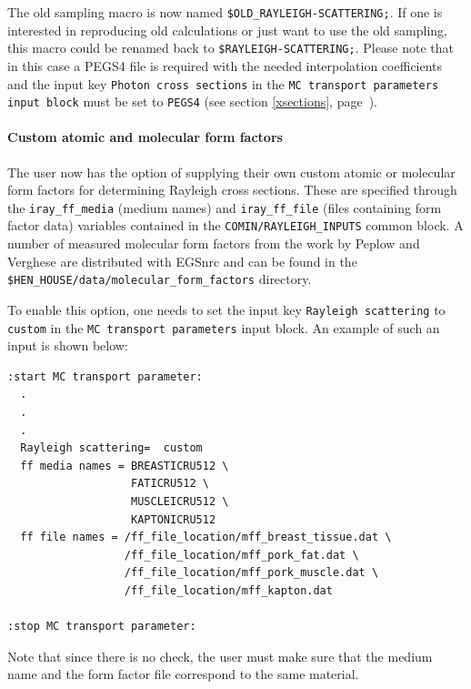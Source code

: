 The old sampling macro is now named {\tt \$OLD\_RAYLEIGH-SCATTERING;}. 
If one is interested
in reproducing old calculations or just want to use the old sampling,
this macro could be renamed back to {\tt \$RAYLEIGH-SCATTERING;}.
Please note that in this case a PEGS4 file is required with the needed
interpolation coefficients and the input key {\tt Photon cross sections} 
in the {\tt MC transport parameters input block} must be set to {\tt PEGS4}
(see section \ref{xsections}, page~\pageref{xsections}).

\paragraph{Custom atomic and molecular form factors}\hfill
\label{custom_ff_sect}

The user now has the option of supplying their own custom atomic
or molecular form factors for determining Rayleigh cross sections.  
These are specified through the {\tt iray\_ff\_media} (medium names) and
{\tt iray\_ff\_file} (files containing form factor data) 
variables contained in the
{\tt COMIN/RAYLEIGH\_INPUTS} common block.
A number of measured molecular form factors from the work by 
Peplow and Verghese \cite{PV98} are distributed with EGSnrc and can be 
found in the {\tt \$HEN\_HOUSE/data/molecular\_form\_factors} directory. 

To enable this option, one needs to set the input key {\tt Rayleigh scattering}
to {\tt custom} in the {\tt MC transport parameters} input block. An example
of such an input is shown below:

\begin{verbatim}
:start MC transport parameter:
  .
  .
  .
  Rayleigh scattering=  custom
  ff media names = BREASTICRU512 \
                   FATICRU512 \
                   MUSCLEICRU512 \
                   KAPTONICRU512     
  ff file names = /ff_file_location/mff_breast_tissue.dat \
                  /ff_file_location/mff_pork_fat.dat \
                  /ff_file_location/mff_pork_muscle.dat \
                  /ff_file_location/mff_kapton.dat

:stop MC transport parameter:
\end{verbatim}

Note that since there is no check, the user must make sure that the medium name and 
the form factor file correspond to the same material.


